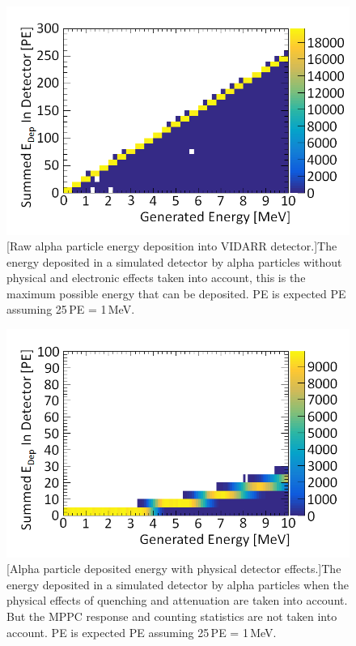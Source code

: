 \begin{figure}[!h]
\centering
\begin{minipage}{.45\textwidth}
  \centering
  \includegraphics[width=\linewidth]{Chapter4/Figs/Raster/truth_vs_summed_alphaMedTextNew.png}
  [Raw alpha particle energy deposition into VIDARR detector.]{The energy deposited in a simulated detector by alpha particles without physical and electronic effects taken into account, this is the maximum possible energy that can be deposited. PE is expected PE assuming 25\,PE = 1\,MeV.} 
  \label{fig:alpha_summed_vs_truth}
\end{minipage}%
\qquad
\begin{minipage}{.45\textwidth}
  \centering
  \includegraphics[width=\linewidth]{Chapter4/Figs/Raster/truth_vs_visSummed_alpha_zoomMedTextNew.png} 
  [Alpha particle deposited energy with physical detector effects.]{The energy deposited in a simulated detector by alpha particles when the physical effects of quenching and attenuation are taken into account. But the MPPC response and counting statistics are not taken into account. PE is expected PE assuming 25\,PE = 1\,MeV.}
  \label{fig:alphaVisVsTruthZoom}
\end{minipage}
\end{figure}

